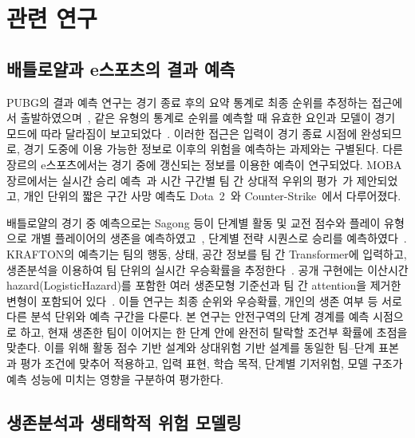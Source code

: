 \section{관련 연구}
\label{sec:related}

\subsection{배틀로얄과 e스포츠의 결과 예측}
\label{sec:related:esports}

PUBG의 결과 예측 연구는 경기 종료 후의 요약 통계로 최종 순위를 추정하는 접근에서 출발하였으며~\cite{KagglePUBG}, 같은 유형의 통계로 순위를 예측할 때 유효한 요인과 모델이 경기 모드에 따라 달라짐이 보고되었다~\cite{LeeLee25}.
이러한 접근은 입력이 경기 종료 시점에 완성되므로, 경기 도중에 이용 가능한 정보로 이후의 위험을 예측하는 과제와는 구별된다.
다른 장르의 e스포츠에서는 경기 중에 갱신되는 정보를 이용한 예측이 연구되었다.
MOBA 장르에서는 실시간 승리 예측~\cite{Hodge21}과 시간 구간별 팀 간 상대적 우위의 평가~\cite{Yu19}가 제안되었고, 개인 단위의 짧은 구간 사망 예측도 Dota~2~\cite{Katona19,Ringer23}와 Counter-Strike~\cite{Marshall22}에서 다루어졌다.

배틀로얄의 경기 중 예측으로는 Sagong 등이 단계별 활동 및 교전 점수와 플레이 유형으로 개별 플레이어의 생존을 예측하였고~\cite{Sagong25a}, 단계별 전략 시퀀스로 승리를 예측하였다~\cite{Sagong25b}.
KRAFTON의 예측기는 팀의 행동, 상태, 공간 정보를 팀 간 Transformer에 입력하고, 생존분석을 이용하여 팀 단위의 실시간 우승확률을 추정한다~\cite{KRAFTON}.
공개 구현에는 이산시간 hazard(LogisticHazard)를 포함한 여러 생존모형 기준선과 팀 간 attention을 제거한 변형이 포함되어 있다~\cite{KRAFTON}.
이들 연구는 최종 순위와 우승확률, 개인의 생존 여부 등 서로 다른 분석 단위와 예측 구간을 다룬다.
본 연구는 안전구역의 단계 경계를 예측 시점으로 하고,  현재 생존한 팀이 이어지는 한 단계 안에 완전히 탈락할 조건부 확률에 초점을 맞춘다.
이를 위해 활동 점수 기반 설계와 상대위험 기반 설계를 동일한 팀--단계 표본과 평가 조건에 맞추어 적용하고, 입력 표현, 학습 목적, 단계별 기저위험, 모델 구조가 예측 성능에 미치는 영향을 구분하여 평가한다.

\subsection{생존분석과 생태학적 위험 모델링}
\label{sec:related:survival}

